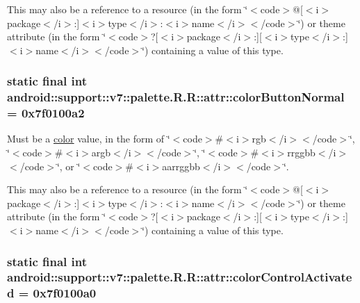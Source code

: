 This may also be a reference to a resource (in the form \char`\"{}$<$code$>$@\mbox{[}$<$i$>$package$<$/i$>$:\mbox{]}$<$i$>$type$<$/i$>$:$<$i$>$name$<$/i$>$$<$/code$>$\char`\"{}) or theme attribute (in the form \char`\"{}$<$code$>$?\mbox{[}$<$i$>$package$<$/i$>$:\mbox{]}\mbox{[}$<$i$>$type$<$/i$>$:\mbox{]}$<$i$>$name$<$/i$>$$<$/code$>$\char`\"{}) containing a value of this type. \hypertarget{classandroid_1_1support_1_1v7_1_1palette_1_1_r_1_1attr_a2693254c5ed55a77816cec6d8aa7ecd}{
\subsubsection[{colorButtonNormal}]{\setlength{\rightskip}{0pt plus 5cm}static final int android::support::v7::palette.R.R::attr::colorButtonNormal = 0x7f0100a2}}
\label{classandroid_1_1support_1_1v7_1_1palette_1_1_r_1_1attr_a2693254c5ed55a77816cec6d8aa7ecd}


Must be a \hyperlink{classandroid_1_1support_1_1v7_1_1palette_1_1_r_1_1color}{color} value, in the form of \char`\"{}$<$code$>$\#$<$i$>$rgb$<$/i$>$$<$/code$>$\char`\"{}, \char`\"{}$<$code$>$\#$<$i$>$argb$<$/i$>$$<$/code$>$\char`\"{}, \char`\"{}$<$code$>$\#$<$i$>$rrggbb$<$/i$>$$<$/code$>$\char`\"{}, or \char`\"{}$<$code$>$\#$<$i$>$aarrggbb$<$/i$>$$<$/code$>$\char`\"{}. 

This may also be a reference to a resource (in the form \char`\"{}$<$code$>$@\mbox{[}$<$i$>$package$<$/i$>$:\mbox{]}$<$i$>$type$<$/i$>$:$<$i$>$name$<$/i$>$$<$/code$>$\char`\"{}) or theme attribute (in the form \char`\"{}$<$code$>$?\mbox{[}$<$i$>$package$<$/i$>$:\mbox{]}\mbox{[}$<$i$>$type$<$/i$>$:\mbox{]}$<$i$>$name$<$/i$>$$<$/code$>$\char`\"{}) containing a value of this type. \hypertarget{classandroid_1_1support_1_1v7_1_1palette_1_1_r_1_1attr_31dd391d58e197dddd77cdf95e64eb9b}{
\subsubsection[{colorControlActivated}]{\setlength{\rightskip}{0pt plus 5cm}static final int android::support::v7::palette.R.R::attr::colorControlActivated = 0x7f0100a0}}
\label{classandroid_1_1support_1_1v7_1_1palette_1_1_r_1_1attr_31dd391d58e197dddd77cdf95e64eb9b}


